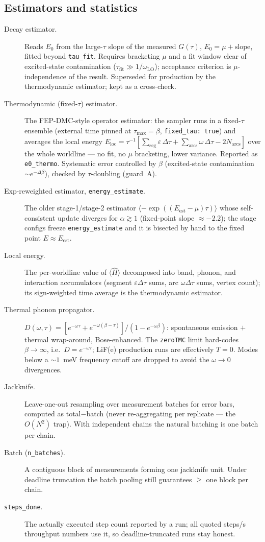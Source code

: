 \documentclass[11pt]{article}
\newcommand{\term}[1]{\item[#1.]}
\begin{document}
\subsection{Estimators and statistics}

\begin{description}
\term{Decay estimator} Reads $E_{0}$ from the large-$\tau$ slope of the measured
  $G(\tau)$, $E_{0}=\mu+\mathrm{slope}$, fitted beyond \texttt{tau\_fit}. Requires
  bracketing $\mu$ and a fit window clear of excited-state contamination
  ($\tau_{\mathrm{fit}}\gg1/\omega_{\mathrm{LO}}$); acceptance criterion is
  $\mu$-independence of the result. Superseded for production by the thermodynamic
  estimator; kept as a cross-check.

\term{Thermodynamic (fixed-$\tau$) estimator} The FEP-DMC-style operator estimator:
  the sampler runs in a fixed-$\tau$ ensemble (external time pinned at
  $\tau_{\max}=\beta$, \texttt{fixed\_tau: true}) and averages the local energy
  $E_{\mathrm{loc}}=\tau^{-1}[\sum_{\mathrm{seg}}\varepsilon\,\Delta\tau
  +\sum_{\mathrm{arcs}}\omega\,\Delta\tau-2N_{\mathrm{arcs}}]$ over the whole
  worldline --- no fit, no $\mu$ bracketing, lower variance. Reported as
  \texttt{e0\_thermo}. Systematic error controlled by $\beta$
  (excited-state contamination $\sim e^{-\Delta\beta}$), checked by $\tau$-doubling
  (guard~A).

\term{Exp-reweighted estimator, \texttt{energy\_estimate}} The older stage-1/stage-2
  estimator $\langle-\exp((E_{\mathrm{est}}-\mu)\tau)\rangle$ whose self-consistent
  update diverges for $\alpha\gtrsim1$ (fixed-point slope $\approx-2.2$); the stage
  configs freeze \texttt{energy\_estimate} and it is bisected by hand to the fixed
  point $E\approx E_{\mathrm{est}}$.

\term{Local energy} The per-worldline value of $\langle\hat H\rangle$ decomposed into
  band, phonon, and interaction accumulators (segment $\varepsilon\Delta\tau$ sums,
  arc $\omega\Delta\tau$ sums, vertex count); its sign-weighted time average is the
  thermodynamic estimator.

\term{Thermal phonon propagator}
  $D(\omega,\tau)=[e^{-\omega\tau}+e^{-\omega(\beta-\tau)}]/(1-e^{-\omega\beta})$:
  spontaneous emission $+$ thermal wrap-around, Bose-enhanced. The
  \texttt{zeroTMC} limit hard-codes $\beta\to\infty$, i.e.\ $D=e^{-\omega\tau}$;
  LiF(e) production runs are effectively $T=0$. Modes below a
  $\sim1$~meV frequency cutoff are dropped to avoid the $\omega\to0$ divergences.

\term{Jackknife} Leave-one-out resampling over measurement batches for error bars,
  computed as total$-$batch (never re-aggregating per replicate --- the $O(N^{2})$
  trap). With independent chains the natural batching is one batch per chain.

\term{Batch (\texttt{n\_batches})} A contiguous block of measurements forming one
  jackknife unit. Under deadline truncation the batch pooling still guarantees
  $\geq$ one block per chain.

\term{\texttt{steps\_done}} The actually executed step count reported by a run; all
  quoted steps/s throughput numbers use it, so deadline-truncated runs stay honest.
\end{description}
\end{document}
